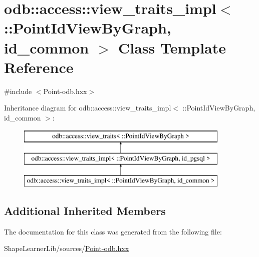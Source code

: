 \hypertarget{classodb_1_1access_1_1view__traits__impl_3_01_1_1_point_id_view_by_graph_00_01id__common_01_4}{}\section{odb\+:\+:access\+:\+:view\+\_\+traits\+\_\+impl$<$ \+:\+:Point\+Id\+View\+By\+Graph, id\+\_\+common $>$ Class Template Reference}
\label{classodb_1_1access_1_1view__traits__impl_3_01_1_1_point_id_view_by_graph_00_01id__common_01_4}


{\ttfamily \#include $<$Point-\/odb.\+hxx$>$}

Inheritance diagram for odb\+:\+:access\+:\+:view\+\_\+traits\+\_\+impl$<$ \+:\+:Point\+Id\+View\+By\+Graph, id\+\_\+common $>$\+:\begin{figure}[H]
\begin{center}
\leavevmode
\includegraphics[height=3.000000cm]{db/d6d/classodb_1_1access_1_1view__traits__impl_3_01_1_1_point_id_view_by_graph_00_01id__common_01_4}
\end{center}
\end{figure}
\subsection*{Additional Inherited Members}


The documentation for this class was generated from the following file\+:\begin{DoxyCompactItemize}
\item 
Shape\+Learner\+Lib/sources/\hyperlink{_point-odb_8hxx}{Point-\/odb.\+hxx}\end{DoxyCompactItemize}
